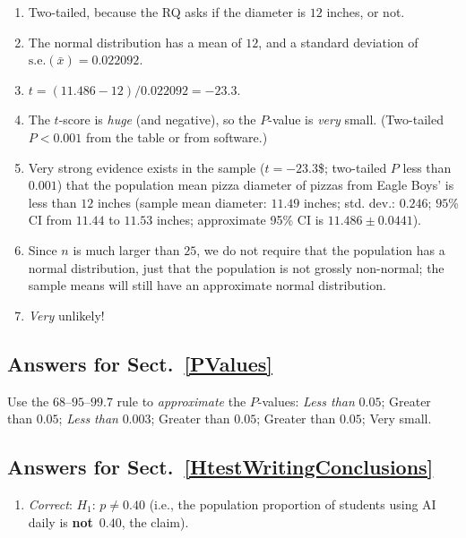 \documentclass[
  11pt,
  a4paper,
  krantz2]{krantz}
\providecommand{\tightlist}{%
  \setlength{\itemsep}{0pt}\setlength{\parskip}{0pt}}
\begin{document}
\begin{footnotesize}
\begin{enumerate}
  \(H_0\): The mean diameter is \(12\) inches; or \(\mu = 12\).\\
  \(H_1\): The mean diameter is not \(12\) inches; or \(\mu \ne 12\)
\item
  Two-tailed, because the RQ asks if the diameter is \(12\) inches, or not.
\item
  The normal distribution has a mean of \(12\), and a standard deviation of \(\text{s.e.}(\bar{x}) = 0.022092\).
\item
  \(t = (11.486-12)/0.022092 = -23.3\).
\item
  The \(t\)-score is \emph{huge} (and negative), so the \(P\)-value is \emph{very} small.
  (Two-tailed \(P<0.001\) from the table or from software.)
\item
  Very strong evidence exists in the sample (\(t = -23.3\)\$; two-tailed \(P\) less than \(0.001\)) that the population mean pizza diameter of pizzas from Eagle Boys' is less than \(12\) inches (sample mean diameter: \(11.49\) inches; std. dev.: \(0.246\);
  \(95\)\% CI from \(11.44\) to \(11.53\) inches; approximate 95\% CI is \(11.486\pm 0.0441\)).
\item
  Since \(n\) is much larger than \(25\), we do not require that the population has a normal distribution, just that the population is not grossly non-normal; the sample means will still have an approximate normal distribution.
\item
  \emph{Very} unlikely!
\end{enumerate}

\subsection*{Answers for Sect.~\ref{PValues}}\label{answers-for-sect.-refpvalues}

Use the \(68\)--\(95\)--\(99.7\) rule to \emph{approximate} the \(P\)-values:
\emph{Less than} \(0.05\); Greater than \(0.05\);
\emph{Less than} \(0.003\);
Greater than \(0.05\);
Greater than \(0.05\);
Very small.

\subsection*{Answers for Sect.~\ref{HtestWritingConclusions}}\label{answers-for-sect.-refhtestwritingconclusions}

\begin{enumerate}
\def\labelenumi{\arabic{enumi}.}
\tightlist
\item
  \emph{Correct}: \(H_1\): \(p \ne 0.40\) (i.e., the population proportion of students using AI daily is \textbf{not}~\(0.40\), the claim).


\end{enumerate}
\end{footnotesize}
\end{document}
